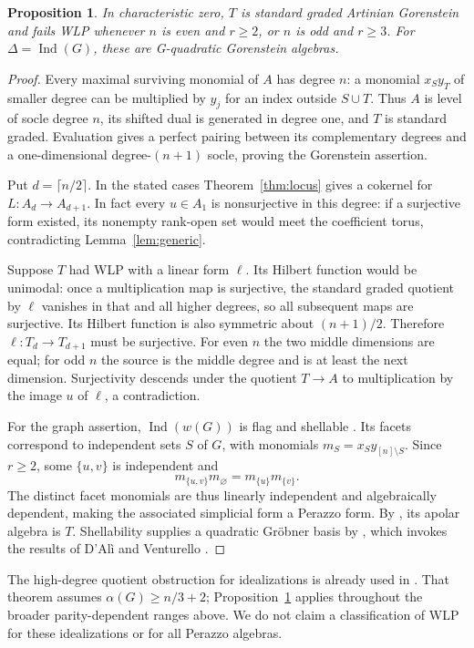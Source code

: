 \documentclass[11pt]{article}
\newtheorem{proposition}[theorem]{Proposition}
\theoremstyle{remark}
\newcommand{\Ind}{\operatorname{Ind}}
\begin{document}
\begin{proposition}\label{prop:idealization}
In characteristic zero, $T$ is standard graded Artinian Gorenstein and fails WLP whenever $n$ is even and $r\geq2$, or $n$ is odd and $r\geq3$. For $\Delta=\Ind(G)$, these are G-quadratic Gorenstein algebras.
\end{proposition}
\begin{proof}
Every maximal surviving monomial of $A$ has degree $n$: a monomial $x_Sy_T$ of smaller degree can be multiplied by $y_j$ for an index outside $S\cup T$. Thus $A$ is level of socle degree $n$, its shifted dual is generated in degree one, and $T$ is standard graded. Evaluation gives a perfect pairing between its complementary degrees and a one-dimensional degree-$(n+1)$ socle, proving the Gorenstein assertion.

Put $d=\lceil n/2\rceil$. In the stated cases Theorem~\ref{thm:locus} gives a cokernel for $L:A_d\to A_{d+1}$. In fact every $u\in A_1$ is nonsurjective in this degree: if a surjective form existed, its nonempty rank-open set would meet the coefficient torus, contradicting Lemma~\ref{lem:generic}.

Suppose $T$ had WLP with a linear form $\ell$. Its Hilbert function would be unimodal: once a multiplication map is surjective, the standard graded quotient by $\ell$ vanishes in that and all higher degrees, so all subsequent maps are surjective. Its Hilbert function is also symmetric about $(n+1)/2$. Therefore $\ell:T_d\to T_{d+1}$ must be surjective. For even $n$ the two middle dimensions are equal; for odd $n$ the source is the middle degree and is at least the next dimension. Surjectivity descends under the quotient $T\to A$ to multiplication by the image $u$ of $\ell$, a contradiction.

For the graph assertion, $\Ind(w(G))$ is flag and shellable \cite[Theorem 2.1]{HN}. Its facets correspond to independent sets $S$ of $G$, with monomials $m_S=x_Sy_{[n]\setminus S}$. Since $r\geq2$, some $\{u,v\}$ is independent and
\[
 m_{\{u,v\}}m_{\varnothing}=m_{\{u\}}m_{\{v\}}.
\]
The distinct facet monomials are thus linearly independent and algebraically dependent, making the associated simplicial form a Perazzo form. By \cite[Lemma 4.5]{HN}, its apolar algebra is $T$. Shellability supplies a quadratic Gr\"obner basis by \cite[Theorem 4.4]{HN}, which invokes the results of D'Al\`i and Venturello \cite[Corollary 8.2 and Proposition 8.3]{DV}.
\end{proof}

The high-degree quotient obstruction for idealizations is already used in \cite[Theorem 4.6]{HN}. That theorem assumes $\alpha(G)\geq n/3+2$; Proposition~\ref{prop:idealization} applies throughout the broader parity-dependent ranges above. We do not claim a classification of WLP for these idealizations or for all Perazzo algebras.
\end{document}
